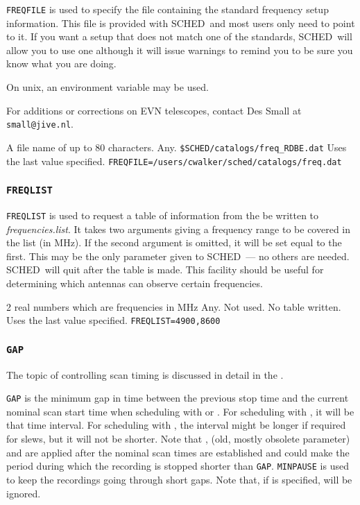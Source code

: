 \documentclass{report}
\newcommand{\schedb}{{\sc SCHED~}}
\begin{document}
{\tt FREQFILE} is used to specify the file containing the standard
frequency setup information.  This file is provided with \schedb and
most users only need to point to it.  If you want a setup that does
not match one of the standards, \schedb will allow you to use one
although it will issue warnings to remind you to be sure you know what
you are doing.

On unix, an environment variable may be used.

For additions or corrections on EVN telescopes, contact
Des Small at {\tt small@jive.nl}.


{A file name of up to 80 characters.}
{Any.}
{{\tt \$SCHED/catalogs/freq\_RDBE.dat}}
{Uses the last value specified.}
{{\tt FREQFILE=/users/cwalker/sched/catalogs/freq.dat}}


\subsubsection{\label{MP:FREQLIST}{\tt FREQLIST}}

{\tt FREQLIST} is used to request a table of information from the
 be written to {\sl
frequencies.list}.  It takes two arguments giving a frequency range to
be covered in the list (in MHz).  If the second argument is omitted,
it will be set equal to the first.  This may be the only parameter
given to \schedb --- no others are needed.  \schedb will quit after
the table is made.  This facility should be useful for determining
which antennas can observe certain frequencies.

{2 real numbers which are frequencies in MHz}
{Any.}
{Not used.  No table written.}
{Uses the last value specified.}
{{\tt FREQLIST=4900,8600}}


\subsubsection{\label{MP:GAP}{\tt GAP}}

The topic of controlling scan timing is discussed in detail in
the .

{\tt GAP} is the minimum gap in time between the previous stop time
and the current nominal scan start time when scheduling with
 or .
For scheduling with , it will be that
time interval.  For scheduling with ,
the interval might be longer if required for slews, but it will not be
shorter.  Note that ,
 (old, mostly obsolete parameter) and
 are applied after the nominal
scan times are established and could make the period during which the
recording is stopped shorter than {\tt GAP}.  {\tt MINPAUSE} is used
to keep the recordings going through short gaps.  Note that, if
 is specified,  will be ignored.
\end{document}
